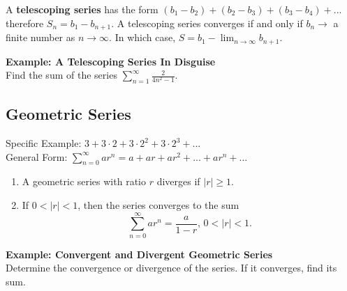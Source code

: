 \documentclass[addpoints, 12pt]{exam}
\begin{document}
\noindent A \textbf{telescoping series} has the form $(b_1-b_2)+(b_2-b_3)+(b_3-b_4)+...$ therefore $S_n=b_1-b_{n+1}$. A telescoping series converges if and only if $b_n\rightarrow$ a finite number as $n\rightarrow\infty$. In which case, $\displaystyle S=b_1-\lim_{n\to\infty}b_{n+1}$.

\newpage


\noindent\textbf{Example: A Telescoping Series In Disguise}\\
Find the sum of the series $\displaystyle\sum_{n=1}^{\infty}\frac{2}{4n^2-1}$.


\subsection*{Geometric Series}
Specific Example: $3+3\cdot2+3\cdot2^2+3\cdot2^3+...$\\
General Form: $\displaystyle\sum_{n=0}^{\infty}ar^n=a+ar+ar^2+...+ar^n+...$

\begin{tcolorbox}[title= CONVERGENCE OF A GEOMETRIC SERIES,colframe=black,sharp corners,colback=white,colbacktitle=white,coltitle=black]

    \begin{enumerate}
        \item A geometric series with ratio $r$ diverges if $|r|\ge1$.
        \item If $0<|r|<1$, then the series converges to the sum
        \[\displaystyle\sum_{n=0}^{\infty}ar^n=\frac{a}{1-r},\, 0<|r|<1.\]
    \end{enumerate}

\end{tcolorbox}
\vspace{.1in}

\noindent\textbf{Example: Convergent and Divergent Geometric Series}\\
Determine the convergence or divergence of the series. If it converges, find its sum.
\end{document}
